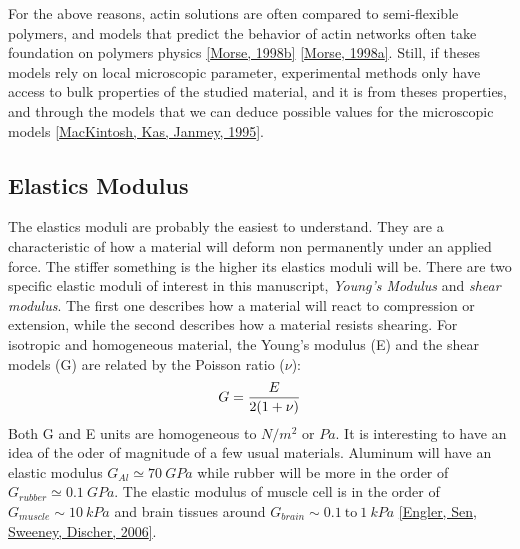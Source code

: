 \documentclass[A4paperpaper,11pt,english]{sphinxmanual}
\begin{document}
For the above reasons, actin solutions are often compared to semi-flexible
polymers, and models that predict the behavior of actin networks often take
foundation on polymers physics {\hyperref[parts/part1:morse1998b]{{[}Morse,  1998b{]}}} {\hyperref[parts/part1:morse1998a]{{[}Morse,  1998a{]}}}. Still, if
theses models rely on local microscopic parameter, experimental methods only
have access to bulk properties of the studied material, and it is from theses
properties, and through the models that we can deduce possible values for the
microscopic models {\hyperref[parts/part1:mackintosh1995]{{[}MacKintosh, Kas, Janmey,  1995{]}}}.


\subsection{Elastics Modulus}
\label{parts/part1:elastics-modulus}\label{parts/part1:elastic-modulus}
The elastics moduli are probably the easiest to understand. They are
a characteristic of how a material will deform non permanently under an applied
force. The stiffer something is the higher its elastics moduli will be. There
are two specific elastic moduli of interest in this
manuscript, \emph{Young's Modulus} and \emph{shear modulus}. The first one describes how a material will react to compression or extension, while the
second describes how a material resists  shearing. For isotropic and homogeneous
material, the Young's modulus (E) and the shear models (G) are related
by the Poisson ratio (\(\nu\)):
\begin{gather}
\begin{split}G = \frac{E}{2(1+\nu)}\end{split}\notag
\end{gather}
Both G and E units are homogeneous to \(N/m^2\) or
\(Pa\).  It is interesting to have an idea of the oder of magnitude of a
few usual materials. Aluminum will have an elastic modulus \(G_{Al}\simeq
70~GPa\) while rubber will be more in the order of \(G_{rubber}\simeq
0.1~GPa\). The elastic modulus of muscle cell is in the order of
\(G_{muscle} \sim 10~kPa\) and brain tissues around \(G_{brain} \sim
0.1~\text{to}~1~kPa\) {\hyperref[parts/part1:engler2006]{{[}Engler, Sen, Sweeney, Discher,  2006{]}}}.
\end{document}
